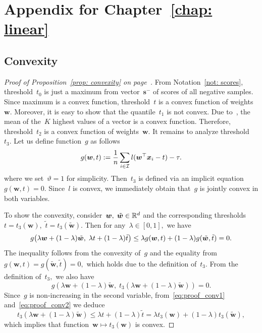 \chapter{Appendix for Chapter~\ref{chap: linear}}
\section{Convexity}

\propconvex*
\begin{proof}[Proof of Proposition~\ref{prop: convexity} on page~\pageref{prop: convexity}]
  From Notation~\ref{not: scores}, threshold~$t_0$ is just a maximum from vector~$\bm{s}^-$ of scores of all negative samples.  Since maximum is a convex function, threshold~$t$ is a convex function of weights~$\bm{w}.$ Moreover, it is easy to show that the quantile~$t_1$ is not convex. Due to~\cite{lapin2015top}, the mean of the~$K$ highest values of a vector is a convex function. Therefore, threshold~$t_2$ is a convex function  of weights~$\bm{w}.$ It remains to analyze threshold~$t_3.$ Let us define function~$g$ as follows
  \begin{equation*}
    g(\bm{w},t) := \frac{1}{n} \sum_{i \in \mathcal{I}} l(\bm{w}^{\top} \bm{x}_i - t) - \tau.
  \end{equation*}
  where we set~$\vartheta = 1$ for simplicity. Then~$t_3$ is defined via an implicit equation~$g(\bm{w},t) = 0.$ Since~$l$ is convex, we immediately obtain that~$g$ is jointly convex in both variables.
  
  To show the convexity, consider~$\bm{w}, \; \tilde{\bm{w}} \in \mathbb{R}^d$ and the corresponding thresholds~$t = t_3(\bm{w})$,~$\tilde{t} = t_3(\tilde{\bm{w}})$. Then for any~$\lambda\in[0,1],$ we have 
  \begin{equation}\label{eq:proof_conv1}
    g\Brac{\lambda \bm{w} + (1 - \lambda)\tilde{\bm{w}}, \;\lambda t + (1 - \lambda)\tilde{t}}
    \leq \lambda g(\bm{w}, t) + (1 - \lambda) g(\tilde{\bm{w}}, \tilde{t}) = 0.
  \end{equation}
  The inequality follows from the convexity of~$g$  and the equality from~$g(\bm{w}, t) = g(\tilde{\bm{w}}, \tilde{t}) = 0,$ which holds due to the definition of~$t_3.$ From the definition of~$t_3,$ we also have
  \begin{equation}\label{eq:proof_conv2}
    g(\lambda\bm{w} + (1-\lambda)\tilde{\bm{w}}, \; t_3(\lambda\bm{w} + (1-\lambda)\tilde{\bm{w}})) = 0.
  \end{equation}
  Since~$g$ is non-increasing in the second variable, from~\eqref{eq:proof_conv1} and~\eqref{eq:proof_conv2} we deduce
  \begin{equation*}
    t_3(\lambda\bm{w} + (1-\lambda)\tilde{\bm{w}})
    \leq \lambda t + (1-\lambda)\tilde{t}
    =   \lambda t_3(\bm{w})+(1-\lambda) t_3(\tilde{\bm{w}}),
  \end{equation*}
  which implies that function~$\bm{w}\mapsto t_3(\bm{w})$ is convex.
\end{proof}

